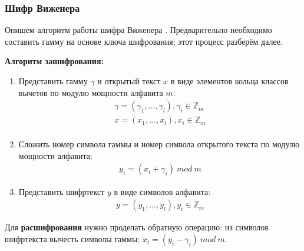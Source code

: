 \subsubsection{Шифр Виженера}
Опишем алгоритм работы шифра Виженера \cite{Bruen_Forcinito_2005}. Предварительно необходимо составить гамму на основе ключа шифрования; этот процесс разберём далее. 

{\bf Алгоритм зашифрования:}  
\begin{enumerate}
    \item Представить гамму $\gamma$ и открытый текст $x$ в виде элементов кольца классов вычетов по модулю мощности алфавита $m$: 
    \begin{align*}
        \gamma=(\gamma_1, ..., \gamma_l), \gamma_i \in \mathbb{Z}_m \\
        x=(x_1, ..., x_l), x_i \in \mathbb{Z}_m \\
    \end{align*}

    \item Сложить номер символа гаммы и номер символа открытого текста по модулю мощности алфавита: 
    \begin{align*}
        y_i=(x_i + \gamma_i) \ mod \ m
    \end{align*}
    \item Представить шифртекст $y$ в виде символов алфавита: 
    \begin{align*}
        y=(y_1, ..., y_l), y_i \in \mathbb{Z}_m
    \end{align*}
\end{enumerate}

Для {\bf расшифрования} нужно проделать обратную операцию: из символов шифртекста вычесть символы гаммы: $ x_i=(y_i - \gamma_i) \ mod \ m $.


